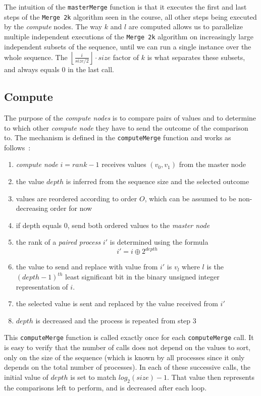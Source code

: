 \documentclass[a4paper,11pt]{article}
\begin{document}
  \noindent The intuition of the \texttt{masterMerge} function is that it executes the first and last steps of the \texttt{Merge 2k} algorithm seen in the course, all other steps being executed by the \textit{compute} nodes. The way $k$ and $l$ are computed allows us to parallelize multiple independent executions of the \texttt{Merge 2k} algorithm on increasingly large independent subsets of the sequence, until we can run a single instance over the whole sequence. The  $\left \lfloor{\frac{i}{size/2}} \right \rfloor \cdot size$ factor of $k$ is what separates these subsets, and always equals $0$ in the last call.
  
\subsection{Compute}
  \noindent The purpose of the \textit{compute nodes} is to compare pairs of values and to determine to which other \textit{compute node} they have to send the outcome of the comparison to. The mechanism is defined in the \texttt{computeMerge} function and works as follows~:
  \begin{enumerate}
  \item \textit{compute node} $i = rank-1$ receives values $(v_0, v_1)$ from the master node
  \item the value $depth$ is inferred from the sequence size and the selected outcome
  \item values are reordered according to order $O$, which can be assumed to be non-decreasing order for now
  \item if depth equals $0$, send both ordered values to the \textit{master node}
  \item the rank of a \textit{paired process} $i'$ is determined using the formula $$i' = i \oplus 2^{depth}$$
  \item the value to send and replace with value from $i'$ is $v_l$ where $l$ is the $(depth-1)^{th}$ least significant bit in the binary unsigned integer representation of $i$. 
  \item the selected value is sent and replaced by the value received from $i'$
  \item $depth$ is decreased and the process is repeated from step $3$
  \end{enumerate}
  
  \noindent This \texttt{computeMerge} function is called exactly once for each \texttt{computeMerge} call. It is easy to verify that the number of calls does not depend on the values to sort, only on the size of the sequence (which is known by all processes since it only depends on the total number of processes). In each of these successive calls, the initial value of $depth$ is set to match $log_2(size)-1$. That value then represents the comparisons left to perform, and is decreased after each loop.\\
  
\end{document}
